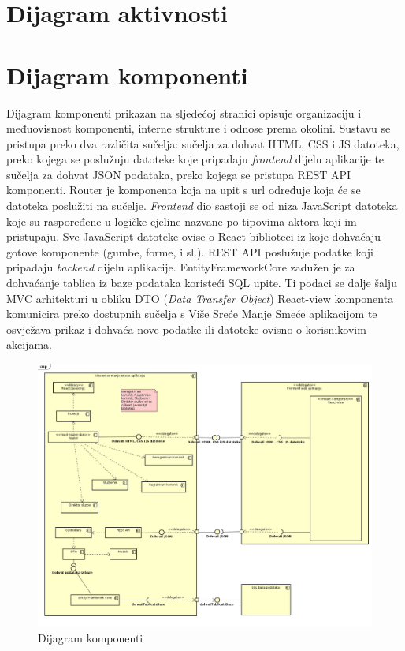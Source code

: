 		\section{Dijagram aktivnosti}
			
%			
			
			\eject
		\section{Dijagram komponenti}
		
			Dijagram komponenti prikazan na sljedećoj stranici opisuje organizaciju i međuovisnost komponenti, interne strukture i odnose prema okolini. Sustavu se pristupa preko dva različita sučelja: sučelja za dohvat HTML, CSS i JS datoteka, preko kojega se poslužuju datoteke koje pripadaju \textit{frontend} dijelu aplikacije te sučelja za dohvat JSON podataka, preko kojega se pristupa REST API komponenti. Router je komponenta koja na upit s url određuje koja će se datoteka poslužiti na sučelje. \textit{Frontend} dio sastoji se od niza JavaScript datoteka koje su raspoređene u logičke cjeline nazvane po tipovima aktora koji im pristupaju. Sve JavaScript datoteke ovise o React biblioteci iz koje dohvaćaju gotove komponente (gumbe, forme, i sl.). REST API poslužuje podatke koji pripadaju \textit{backend} dijelu aplikacije. EntityFrameworkCore zadužen je za dohvaćanje tablica iz baze podataka koristeći SQL upite. Ti podaci se dalje šalju MVC arhitekturi u obliku DTO (\textit{Data Transfer Object}) React-view komponenta komunicira preko dostupnih sučelja s Više Sreće Manje Smeće aplikacijom te osvježava prikaz i dohvaća nove podatke ili datoteke ovisno o korisnikovim akcijama.


			\eject

			\begin{figure}
				\centering
				\includegraphics[width=1.0\linewidth]{slike/ComponentDiagram.jpg}
				\caption{Dijagram komponenti}
				\label{fig:ComponentDiagram}
			\end{figure}

			\clearpage
			\eject